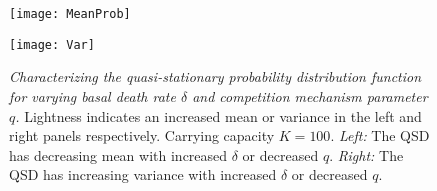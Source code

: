 
\iffalse
\begin{figure}[h]
	\centering
	\subfloat[\emph{Probability distribution with $\delta=1.00$ and $K=100$}]{\texttt{[image: Figure1-A]}\label{qsd:q}}
	\hfill
	\subfloat[\emph{Probability distribution with $q=0.06$ and $K=100$}]{\texttt{[image: Figure1-B]}\label{qsd:delta}}
	\caption{\emph{Probability distribution of the population} The conditional probability distribution functions as found using the quasi-stationary distribution algorithm. Note that for each curve, the population cutoff $N$ is outside the domain presented here. In \ref{qsd:q} increasing lightness indicates an increase in $q$. Similarly, the lightness increase in \ref{qsd:delta} corresponds to an increase in $\delta$}
	\label{qsd}
\end{figure}
\fi
\begin{figure}[h]
	\centering
	\begin{minipage}{0.49\linewidth}
		\centering
		\texttt{[image: MeanProb]}
	\end{minipage}
	\begin{minipage}{0.49\linewidth}
		\centering
		\texttt{[image: Var]}
	\end{minipage}
	\caption{\emph{Characterizing the quasi-stationary probability distribution function for varying basal death rate $\delta$ and competition mechanism parameter $q$.} Lightness indicates an increased mean or variance in the left and right panels respectively. Carrying capacity $K=100$. 
	\emph{Left:} The QSD has decreasing mean with increased $\delta$ or decreased $q$. 
	\emph{Right:} The QSD has increasing variance with increased $\delta$ or decreased $q$. 
	}
	\label{qsd}
\end{figure}


